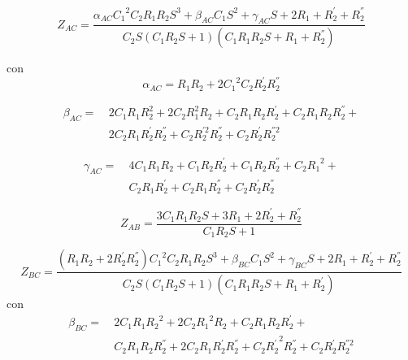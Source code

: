 \documentclass[a4paper]{article}
\begin{document}
\begin{equation*}
	Z_{AC} =  \frac{\alpha_{AC} {C_{1}}^{2} C_2 R_{1} R_{2} S^{3} + \beta_{AC} C_1 S^{2}
		+ \gamma_{AC} S + 2 R_1 + R_{2}^{'} + R_{2}^{''}}{
		 C_2 S \left( C_1 R_{2} S + 1 \right)
		\left(C_1 R_1 R_{2} S + R_1 + R_{2}^{''}\right)}
\end{equation*}

con
$$
	\alpha_{AC} = R_{1} R_{2} + 2 {C_{1}}^{2} C_2 R_{2}^{'} R_{2}^{''}
$$

\begin{equation*}
\begin{split}
	\beta_{AC} =\ & 2 C_{1} R_1 R_{2}^{2} + 2 C_2 R_{1}^{2} R_{2} + C_2 R_1 R_{2} R_{2}^{'} +
		C_2 R_1 R_{2} R_{2}^{''} +\\
		&2 C_2 R_1 R_{2}^{'} R_{2}^{''} +
		C_2 R_{2}^{'2} R_{2}^{''} + C_2 R_{2}^{'} R_{2}^{''2}
\end{split}
\end{equation*}

\begin{equation*}
\begin{split}
	\gamma_{AC} =\ & 4 C_1 R_1 R_{2} + C_1 R_{2} R_{2}^{'} + C_1 R_{2} R_{2}^{''} +
		C_2 {R_{1}}^{2} +\\
		&C_2 R_1 R_{2}^{'} + C_2 R_1 R_{2}^{''} + C_2 R_{2}^{'} R_{2}^{''}
\end{split}
\end{equation*}

\begin{equation*}
	Z_{AB} = \frac{3 C_1 R_1 R_{2} S + 3 R_1 + 2 R_{2}^{'} + R_{2}^{''}}{C_1 R_{2} S + 1}
\end{equation*}

\begin{equation*}
	Z_{BC} =
	\frac{ \left( R_1 R_{2} + 2 R_{2}^{'} R_{2}^{''} \right ){C_{1}}^{2} C_2 R_1 R_{2} S^{3} +
	\beta_{BC} C_1 S^{2} + \gamma_{BC} S + 2 R_1 + R_{2}^{'} + R_{2}^{''}}
	{C_2 S \left(C_1 R_{2} S + 1\right) \left(C_1 R_1 R_{2} S + R_1 + R_{2}^{'} \right)}
\end{equation*}
con
\begin{equation*}
\begin{split}
	\beta_{BC} =\ & 2 C_1 R_1 {R_{2}}^{2} + 2C_2 {R_{1}}^{2} R_{2} + C_2 R_1 R_{2} R_{2}^{'} +\\
	&C_2 R_1 R_{2} R_{2}^{''} + 2 C_2 R_1 R_{2}^{'} R_{2}^{''} + 
	C_2 {R_{2}^{'}}^2 R_{2}^{''} + C_2 R_{2}^{'} R_{2}^{''2}
\end{split}
\end{equation*}
\end{document}
